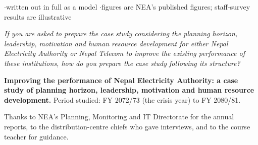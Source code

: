 
\vspace{2pt}


{\color{sub}\footnotesize {}  \gap$\cdot$\gap written out in full as a model \gap$\cdot$\gap figures are NEA's published figures; staff-survey results are illustrative \gap \added}

{\small\itshape If you are asked to prepare the case study considering the planning horizon,
leadership, motivation and human resource development for either Nepal Electricity Authority
or Nepal Telecom to improve the existing performance of these institutions, how do you prepare
the case study following its structure?}

\textbf{Improving the performance of Nepal Electricity Authority: a case study of planning
horizon, leadership, motivation and human resource development.} Period studied: FY 2072/73
(the crisis year) to FY 2080/81.

Thanks to NEA's Planning, Monitoring and IT Directorate for the annual reports, to the
distribution-centre chiefs who gave interviews, and to the course teacher for guidance.

